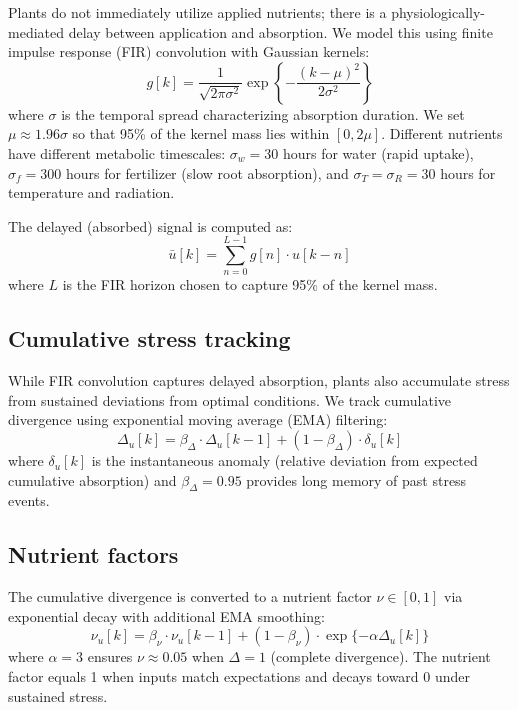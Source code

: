 \documentclass[preprint,12pt]{elsarticle}
\newcommand{\df}[2]{\displaystyle\frac{#1}{#2}}
\begin{document}
Plants do not immediately utilize applied nutrients; there is a physiologically-mediated delay between application and absorption. We model this using finite impulse response (FIR) convolution with Gaussian kernels:
\begin{equation}
g[k] = \df{1}{\sqrt{2\pi\sigma^2}}\exp\left\{-\df{(k-\mu)^2}{2\sigma^2}\right\}
\label{eqn:gaussian-kernel}
\end{equation}
where $\sigma$ is the temporal spread characterizing absorption duration. We set $\mu \approx 1.96\sigma$ so that 95\% of the kernel mass lies within $[0, 2\mu]$. Different nutrients have different metabolic timescales: $\sigma_w = 30$ hours for water (rapid uptake), $\sigma_f = 300$ hours for fertilizer (slow root absorption), and $\sigma_T = \sigma_R = 30$ hours for temperature and radiation.

The delayed (absorbed) signal is computed as:
\begin{equation}
\bar{u}[k] = \sum_{n=0}^{L-1} g[n] \cdot u[k-n]
\label{eqn:convolution}
\end{equation}
where $L$ is the FIR horizon chosen to capture 95\% of the kernel mass.

\subsection{Cumulative stress tracking}\label{subsec:stress}

While FIR convolution captures delayed absorption, plants also accumulate stress from sustained deviations from optimal conditions. We track cumulative divergence using exponential moving average (EMA) filtering:
\begin{equation}
\Delta_u[k] = \beta_\Delta \cdot \Delta_u[k-1] + (1-\beta_\Delta) \cdot \delta_u[k]
\label{eqn:ema}
\end{equation}
where $\delta_u[k]$ is the instantaneous anomaly (relative deviation from expected cumulative absorption) and $\beta_\Delta = 0.95$ provides long memory of past stress events.

\subsection{Nutrient factors}\label{subsec:nutrient-factors}

The cumulative divergence is converted to a nutrient factor $\nu \in [0,1]$ via exponential decay with additional EMA smoothing:
\begin{equation}
\nu_u[k] = \beta_\nu \cdot \nu_u[k-1] + (1-\beta_\nu) \cdot \exp\{-\alpha \Delta_u[k]\}
\label{eqn:nutrient-factor}
\end{equation}
where $\alpha = 3$ ensures $\nu \approx 0.05$ when $\Delta = 1$ (complete divergence). The nutrient factor equals 1 when inputs match expectations and decays toward 0 under sustained stress.
\end{document}
